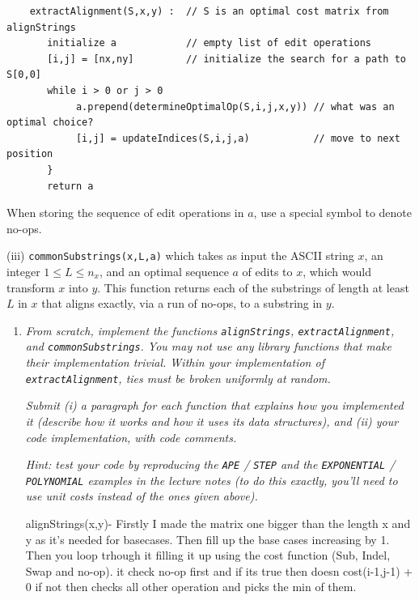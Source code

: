 \documentclass[12pt]{article}
\begin{document}
\begin{enumerate}
	\begin{small}
	\begin{verbatim}
	extractAlignment(S,x,y) :  // S is an optimal cost matrix from alignStrings
	   initialize a            // empty list of edit operations
	   [i,j] = [nx,ny]         // initialize the search for a path to S[0,0]
	   while i > 0 or j > 0
	        a.prepend(determineOptimalOp(S,i,j,x,y)) // what was an optimal choice?
	        [i,j] = updateIndices(S,i,j,a)           // move to next position
	   }
	   return a
	\end{verbatim}
	\end{small}
	
	When storing the sequence of edit operations in $a$, use a special symbol to denote no-ops.
	
	(iii) {\tt commonSubstrings(x,L,a)} which takes as input the ASCII string $x$, an integer $1\leq L \leq n_{x}$, and an optimal sequence $a$ of edits to $x$, which would transform $x$ into $y$. This function returns each of the substrings of length at least $L$ in $x$ that aligns exactly, via a run of no-ops, to a substring in $y$.

	\begin{enumerate}

	\item\textit{ From scratch, implement the functions {\tt alignStrings}, {\tt extractAlignment}, and {\tt commonSubstrings}. You may not use any library functions that make their implementation trivial. Within your implementation of {\tt extractAlignment}, ties must be broken uniformly at random.}
	
	\textit{Submit (i) a paragraph for each function that explains how you implemented it (describe how it works and how it uses its data structures), and (ii) your code implementation, with code comments. \label{q:align:code}}
	
	\textit{Hint: test your code by reproducing the {\tt APE} / {\tt STEP} and the {\tt EXPONENTIAL} / {\tt POLYNOMIAL} examples in the lecture notes (to do this exactly, you'll need to use unit costs instead of the ones given above).}
	

alignStrings(x,y)-  Firstly I made the matrix one bigger than the length x and y as it's needed for basecases. Then fill up the base cases increasing by 1. Then you loop trhough it filling it up using the cost function (Sub, Indel, Swap and no-op). it check no-op first and if its true then doesn cost(i-1,j-1) + 0 if not then checks all other operation and picks the min of them. \\


\end{enumerate}
\end{enumerate}
\end{document}
